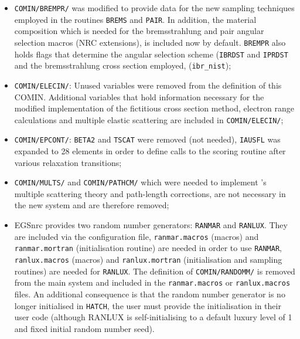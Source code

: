 \begin{itemize}
\item
{\tt COMIN/BREMPR/} was modified to provide 
data for the new sampling techniques employed 
in the routines {\tt BREMS} and {\tt PAIR}. 
In addition, the material composition which 
is needed for the bremsstrahlung and pair angular selection 
macros (NRC extensions), is included now by default. 
{\tt BREMPR} also holds flags that determine the 
angular selection scheme ({\tt IBRDST} and {\tt IPRDST} 
and the bremsstrahlung cross section employed, ({\tt ibr\_nist});
   

\item
{\tt COMIN/ELECIN/}: Unused variables were removed from the 
definition of this COMIN. Additional variables that 
hold information necessary for the modified implementation 
of the fictitious cross section method, electron range 
calculations and multiple elastic scattering are included 
in {\tt COMIN/ELECIN/};

\item
{\tt COMIN/EPCONT/}: {\tt BETA2} and {\tt TSCAT} were removed 
(not needed), {\tt IAUSFL} was expanded to 28 elements in order 
to define calls to the scoring routine after various 
relaxation transitions;
   


\item
{\tt COMIN/MULTS/} and {\tt COMIN/PATHCM/} which were needed to implement
\Mol's multiple scattering theory and path-length corrections, are not
necessary in the new system and are therefore removed;
 

\item
EGSnrc provides two random number generators:
{\tt RANMAR}\cite{MZ91,Ma90a} and {\tt RANLUX}\cite{La94,Ja94}. 
They are included
via the configuration file, {\tt ranmar.macros}
(macros) and {\tt ranmar.mortran} (initialisation routine)
are needed in order to use {\tt RANMAR}, {\tt ranlux.macros}
(macros) and {\tt ranlux.mortran} (initialisation and
sampling routines) are needed for {\tt RANLUX}. The definition
of {\tt COMIN/RANDOMM/} is removed from the main system and 
included in the {\tt ranmar.macros} or {\tt ranlux.macros} 
files. An additional consequence is that the random 
number generator is no longer initialised in {\tt HATCH}, 
the user must provide the initialisation in their user code (although
RANLUX is self-initialising to a default luxury level of 1 and fixed
initial random number seed). 
 



\end{itemize}
